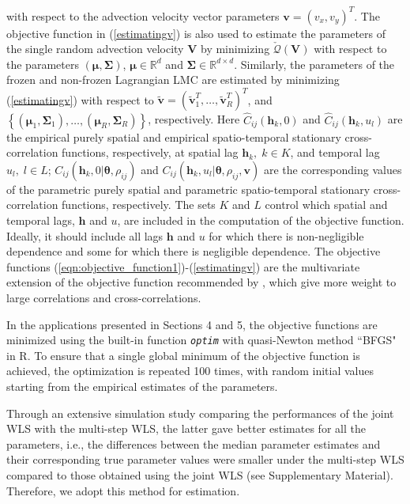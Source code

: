 \documentclass[12pt]{article}
\newcommand{\0}{\mathbf{0}}
\begin{document}
with respect to the advection velocity vector parameters $\mathbf{v}=(v_x,v_y)^T$. The objective function in (\ref{estimatingv}) is also used to estimate the parameters of the single random advection velocity $\mathbf{V}$ by minimizing $\check{\mathcal{Q}}(\mathbf{V})$ with respect to the parameters $\left(\boldsymbol{\mu},\boldsymbol{\Sigma}\right)$, $\boldsymbol{\mu}\in  \mathbb{R}^d$ and $\boldsymbol{\Sigma}\in  \mathbb{R}^{d\times d}$. Similarly, the parameters of the frozen and non-frozen Lagrangian LMC are estimated by minimizing (\ref{estimatingv}) with respect to $\tilde{\mathbf{v}}=\left(\tilde{\mathbf{v}}_1^T,\ldots,\tilde{\mathbf{v}}_R^T\right)^T$, and $\left\{\left(\boldsymbol{\mu}_1,\boldsymbol{\Sigma}_1\right),\ldots, \left(\boldsymbol{\mu}_R,\boldsymbol{\Sigma}_R\right)\right\}$, respectively. Here $\widehat{C}_{ij}(\mathbf{h}_k,0)$ and $\widehat{C}_{ij}(\mathbf{h}_k,u_l)$ are the empirical purely spatial and empirical spatio-temporal stationary cross-correlation functions, respectively, at spatial lag $\mathbf{h}_k,\; k \in K$, and temporal lag $u_l,\; l \in L$; $C_{ij}(\mathbf{h}_k,0|\boldsymbol{\theta}, \rho_{ij})$ and $C_{ij}(\mathbf{h}_k,u_l|\boldsymbol{\theta}, \rho_{ij}, \mathbf{v})$ are the corresponding values of the parametric purely spatial and parametric spatio-temporal stationary cross-correlation functions, respectively. The sets $K$ and $L$ control which spatial and temporal lags, $\mathbf{h}$ and $u$, are included in the computation of the objective function. Ideally, it should include all lags $\mathbf{h}$ and $u$ for which there is non-negligible dependence and some for which there is negligible dependence. The objective functions (\ref{eqn:objective_function1})-(\ref{estimatingv}) are the multivariate extension of the objective function recommended by \citet{gneiting2002}, which give more weight to large correlations and cross-correlations. 

In the applications presented in Sections 4 and 5, the objective functions are minimized using the built-in function \emph{\tt optim} with quasi-Newton method ``BFGS" in \textsf{R}. To ensure that a single global minimum of the objective function is achieved, the optimization is repeated 100 times, with random initial values starting from the empirical estimates of the parameters. 

Through an extensive simulation study comparing the performances of the joint WLS with the multi-step WLS, the latter gave better estimates for all the parameters, i.e., the differences between the median parameter estimates and their corresponding true parameter values were smaller under the multi-step WLS compared to those obtained using the joint WLS (see Supplementary Material). Therefore, we adopt this method for estimation.
\end{document}
